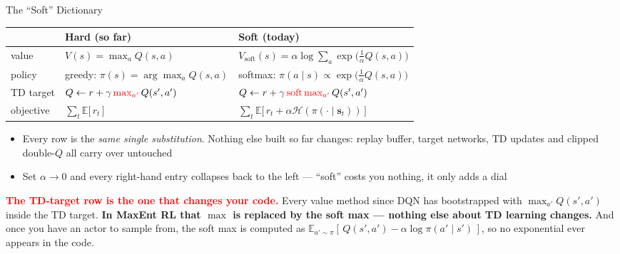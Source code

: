 \begin{frame}{The ``Soft'' Dictionary}
\small
\begin{center}
\renewcommand{\arraystretch}{1.7}
\begin{tabular}{p{} p{} p{}}
\hline
& \textbf{Hard (so far)} & \textbf{Soft (today)} \\
\hline
value & $V(s) = \max_a Q(s,a)$
      & $V_{\text{soft}}(s) = \alpha\log\sum_a \exp\!\big(\tfrac1\alpha Q(s,a)\big)$ \\
policy & greedy: $\pi(s) = \arg\max_a Q(s,a)$
      & softmax: $\pi(a\mid s) \propto \exp\!\big(\tfrac1\alpha Q(s,a)\big)$ \\
TD target & $Q \leftarrow r + \gamma \,\textcolor{red}{\max_{a'}}\, Q(s',a')$
      & $Q \leftarrow r + \gamma \,\textcolor{red}{\operatorname{soft\,max}_{a'}}\, Q(s',a')$ \\
objective & $\sum_t \mathbb{E}\big[\,r_t\,\big]$
      & $\sum_t \mathbb{E}\big[\,r_t + \alpha\mathcal{H}(\pi(\cdot\mid \mathbf{s}_t))\,\big]$ \\
\hline
\end{tabular}
\end{center}
\vspace{0.1em}
{\footnotesize
\begin{itemize}
    \item Every row is the \emph{same single substitution}. Nothing else built so far changes: replay buffer, target networks, TD updates and clipped double-$Q$ all carry over untouched
    \item Set $\alpha \to 0$ and every right-hand entry collapses back to the left --- ``soft'' costs you nothing, it only adds a dial
\end{itemize}
\vspace{0.3em}
\textcolor{red}{\textbf{The TD-target row is the one that changes your code.}} Every value method since DQN has bootstrapped with $\max_{a'}Q(s',a')$ inside the TD target. \textbf{In MaxEnt RL that $\max$ is replaced by the soft max --- nothing else about TD learning changes.} And once you have an actor to sample from, the soft max is computed as $\mathbb{E}_{a'\sim\pi}[\,Q(s',a') - \alpha\log\pi(a'\mid s')\,]$, so no exponential ever appears in the code.}
\end{frame}
